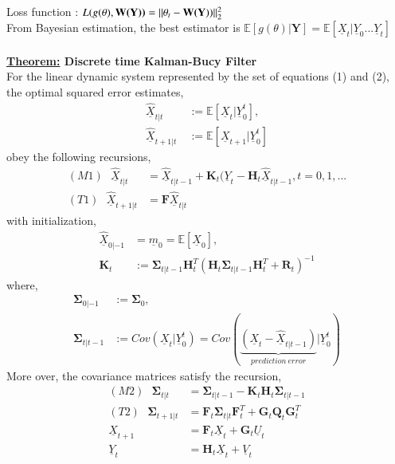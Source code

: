 \documentclass[a4paper,english,12pt]{article}
\begin{document}
  Loss function : $L(g(\theta),\textbf{W(\textbf{Y}))} = ||\theta_t - \textbf{W(\textbf{Y}}))||_2^2$\\
  From Bayesian estimation, the best estimator is $\mathbb{E}[g(\theta)|\textbf{Y}]=
  \mathbb{E}[\underline{X}_t|\underline{Y}_0...\underline{Y}_t]$\\\\
 \textbf{\underline{Theorem:} Discrete time Kalman-Bucy Filter}\\
  For the linear dynamic system represented by the set of equations (1) and (2), the optimal squared error estimates,
  \begin{align*}
  \underline{\hat{X}}_{t|t}\ &:= \mathbb{E}[\underline{X}_t|\underline{Y}_0^t],\\
  \underline{\hat{X}}_{t+1|t}\ &:= \mathbb{E}[\underline{X}_{t+1}|\underline{Y}_0^t]
  \end{align*}
   obey the following recursions,
 \begin{align*}
  (M1)\ \ \ \underline{\hat{X}}_{t|t}&=\underline{\hat{X}}_{t|t-1} + \textbf{K}_t(\underline{Y}_t-\textbf{H}_t\underline{\hat{X}}_{t|t-1}, t=0,1,...\\
  (T1)\ \ \ \underline{\hat{X}}_{t+1|t}&=\textbf{F}\underline{\hat{X}}_{t|t}
 \end{align*} 
with initialization,
\begin{align*}
\underline{\hat{X}}_{0|-1}&=\underline{m}_0=\mathbb{E}[\underline{X}_0],\\
\textbf{K}_t&:= \mathbf{\Sigma}_{t|t-1} \textbf{H}_t^T(\textbf{H}_t \mathbf{\Sigma}_{t|t-1}\textbf{H}_t^T+\textbf{R}_t)^{-1}
\end{align*}
where,
\begin{align*}
\mathbf{\Sigma}_{0|-1}&:= \mathbf{\Sigma}_0,\\
\mathbf{\Sigma}_{t|t-1}&:= Cov(\underline{X}_t|\underline{Y}_0^t)=Cov(\underbrace{(\underline{X}_t-\underline{\hat{X}}_{t|t-1})}_{prediction\ error}|\underline{Y}_0^t)
\end{align*}
More over, the covariance matrices satisfy the recursion,
\begin{align*}
(M2)\ \ \ \mathbf{\Sigma}_{t|t}&=\mathbf{\Sigma}_{t|t-1}-\textbf{K}_t\textbf{H}_t\mathbf{\Sigma}_{t|t-1}\\
(T2)\ \ \ \mathbf{\Sigma}_{t+1|t}&=\textbf{F}_t\mathbf{\Sigma}_{t|t}\textbf{F}_t^T + \textbf{G}_t\textbf{Q}_t\textbf{G}_t^T\\
\underline{X}_{t+1}&=\textbf{F}_t\underline{X}_t+\textbf{G}_t\underline{U}_t\\
\underline{Y}_t&=\textbf{H}_t\underline{X}_t+\underline{V}_t
\end{align*}
\end{document}
